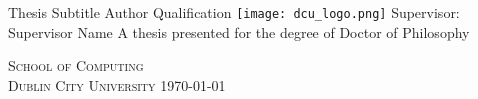 \begin{titlepage}
    \begin{center}
        \vspace*{1cm}
        \Huge
        \textbf{\thesisTitle}
\vfill
        \LARGE
        Thesis Subtitle
\vfill       
        \LARGE
        \textbf{\authorName}
\vfill     
        Author Qualification
\vfill
        \texttt{[image: dcu\_logo.png]}
\vfill
        Supervisor: Supervisor Name
\vfill      
        \Large
        A thesis presented for the degree of Doctor of Philosophy
        
\vfill
        \LARGE
	    \textsc{School of Computing \\
	    Dublin City University}
\vfill	    
	    \LARGE
	    \monthyeardate\today

    \end{center}
\end{titlepage}